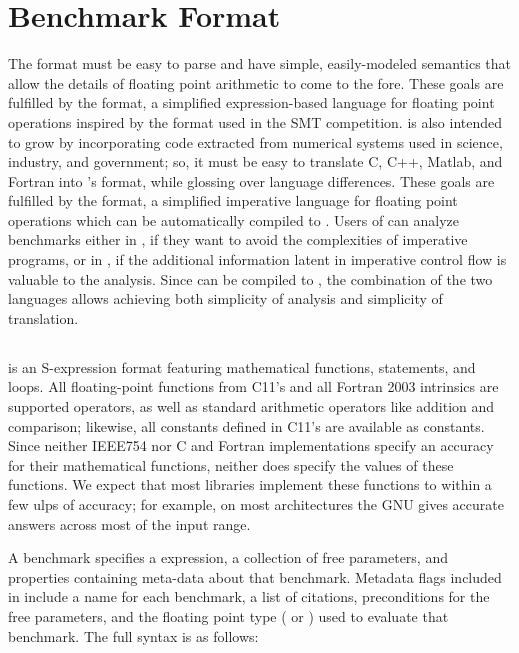 \documentclass[main.tex]{subfiles}
\begin{document}
\section{Benchmark Format}
\label{sec:format}

The \name format must be easy to parse
  and have simple, easily-modeled semantics
  that allow the details of floating point arithmetic
  to come to the fore.
These goals are fulfilled by the \core format,
  a simplified expression-based language for floating point operations
  inspired by the \smtlib format used in the SMT competition.
\name is also intended to grow
  by incorporating code extracted
  from numerical systems used in science, industry, and government;
  so, it must be easy to translate C, C++, Matlab, and Fortran
  into \name's format,
  while glossing over language differences.
These goals are fulfilled by the \surface format,
  a simplified imperative language for floating point operations
  which can be automatically compiled to \core.
Users of \name can analyze benchmarks either in \core,
  if they want to avoid the complexities of imperative programs,
  or in \surface,
  if the additional information latent in imperative control flow
  is valuable to the analysis.
Since \surface can be compiled to \core,
  the combination of the two languages
  allows achieving both simplicity of analysis
  and simplicity of translation.
  
\subsection{\core}

\core is an S-expression format featuring
  mathematical functions,  statements, and  loops.
All floating-point functions
  from C11's  and all Fortran 2003 intrinsics
  are supported operators,
  as well as standard arithmetic operators like addition and comparison;
  likewise, all constants defined in C11's  are available as constants.
Since neither IEEE754 nor C and Fortran implementations specify
  an accuracy for their mathematical functions,
  neither does \core specify the values of these functions.
We expect that most libraries implement these functions
  to within a few ulps of accuracy;
  for example, on most architectures
  the GNU  gives accurate answers across most of the input range.

A \core benchmark specifies a \core expression,
  a collection of free parameters,
  and properties containing meta-data about that benchmark.
Metadata flags included in \name include a name for each benchmark,
  a list of citations, preconditions for the free parameters,
  and the floating point type ( or )
  used to evaluate that benchmark.
The full \core syntax is as follows:
\end{document}

